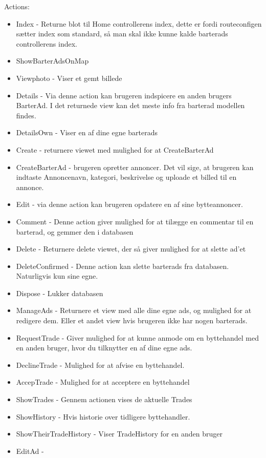 Actions:
\begin{itemize}
	\item Index - Returne blot til Home controllerens index, dette er fordi routeconfigen sætter index som standard, så man skal ikke kunne kalde barterads controllerens index.
	\item ShowBarterAdsOnMap
	\item Viewphoto - Viser et gemt billede
	\item Details - Via denne action kan brugeren indspicere en anden brugers  BarterAd. I det returnede view kan det meste info fra barterad modellen findes.
	\item DetailsOwn - Viser en af dine egne barterads
	\item Create - returnere viewet med mulighed for at CreateBarterAd
	\item CreateBarterAd - brugeren opretter annoncer. Det vil sige, at brugeren kan indtaste Annoncenavn, kategori, beskrivelse og uploade et billed til en annonce. 
	\item Edit - via denne action kan brugeren opdatere en af sine bytteannoncer.
	\item Comment - Denne action giver mulighed for at tilægge en commentar til en barterad, og gemmer den i databasen
	\item Delete - Returnere delete viewet, der så giver mulighed for at slette ad'et 
	\item DeleteConfirmed - Denne action kan slette barterads fra databasen. Naturligvis kun sine egne. 
	\item Dispose - Lukker databasen
	\item ManageAds - Returnere et view med alle dine egne ads, og mulighed for at redigere dem. Eller et andet view hvis brugeren ikke har nogen barterads. 
	\item RequestTrade - Giver mulighed for at kunne anmode om en byttehandel med en anden bruger, hvor du tilknytter en af dine egne ads.
	\item DeclineTrade - Mulighed for at afvise en byttehandel. 
	\item AccepTrade - Mulighed for at acceptere en byttehandel
	\item ShowTrades - Gennem actionen vises de aktuelle Trades
	\item ShowHistory - Hvis historie over tidligere byttehandler.
	\item ShowTheirTradeHistory - Viser TradeHistory for en anden bruger
	
	\item EditAd - 
\end{itemize}

